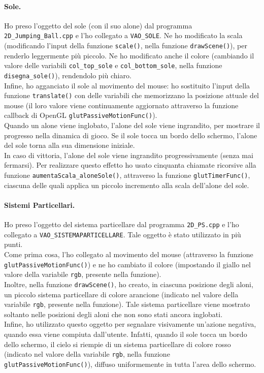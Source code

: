 \documentclass[a4paper, 12pt]{article}
\begin{document}
\paragraph{Sole.}
Ho preso l'oggetto del sole (con il suo alone) dal programma \texttt{2D\allowbreak\_Jumping\_Ball.cpp} e l'ho collegato a \texttt{VAO\_SOLE}. Ne ho modificato la scala (modificando l'input della funzione \texttt{scale()}, nella funzione \texttt{drawScene()}), per renderlo leggermente più piccolo. Ne ho modificato anche il colore (cambiando il valore delle variabili \texttt{col\_top\_sole} e \texttt{col\_bottom\_sole}, nella funzione \texttt{disegna\_sole()}), rendendolo più chiaro.\\
Infine, ho agganciato il sole al movimento del mouse: ho sostituito l'input della funzione \texttt{translate()} con delle variabili che memorizzano la posizione attuale del mouse (il loro valore viene continuamente aggiornato attraverso la funzione callback di OpenGL \texttt{glutPassiveMotionFunc()}).\\
Quando un alone viene inglobato, l'alone del sole viene ingrandito, per mostrare il progresso nella dinamica di gioco. Se il sole tocca un bordo dello schermo, l'alone del sole torna alla sua dimensione iniziale.\\
In caso di vittoria, l'alone del sole viene ingrandito progressivamente (senza mai fermarsi). Per realizzare questo effetto ho usato cinquanta chiamate ricorsive alla funzione \texttt{aumentaScala\_aloneSole()}, attraverso la funzione \texttt{glutTimerFunc()}, ciascuna delle quali applica un piccolo incremento alla scala dell'alone del sole.

\paragraph{Sistemi Particellari.}
Ho preso l'oggetto del sistema particellare dal programma \texttt{2D\_PS.cpp} e l'ho collegato a \texttt{VAO\_SISTEMAPARTICELLARE}. Tale oggetto è stato utilizzato in più punti.\\
Come prima cosa, l'ho collegato al movimento del mouse (attraverso la funzione \texttt{glutPassiveMotionFunc()}) e ne ho cambiato il colore (impostando il giallo nel valore della variabile \texttt{rgb}, presente nella funzione).\\
Inoltre, nella funzione \texttt{drawScene()}, ho creato, in ciascuna posizione degli aloni, un piccolo sistema particellare di colore arancione (indicato nel valore della variabile \texttt{rgb}, presente nella funzione). Tale sistema particellare viene mostrato soltanto nelle posizioni degli aloni che non sono stati ancora inglobati.\\
Infine, ho utilizzato questo oggetto per segnalare visivamente un'azione negativa, quando essa viene compiuta dall'utente. Infatti, quando il sole tocca un bordo dello schermo, il cielo si riempie di un sistema particellare di colore rosso (indicato nel valore della variabile \texttt{rgb}, nella funzione \texttt{glutPassiveMotionFunc()}), diffuso uniformemente in tutta l'area dello schermo.
\end{document}
